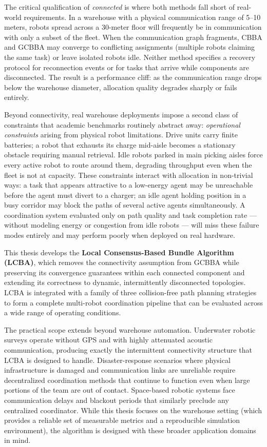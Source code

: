 The critical qualification of \emph{connected} is where both methods fall
short of real-world requirements.
In a warehouse with a physical communication range of 5--10 meters,
robots spread across a 30-meter floor will frequently be in communication with
only a subset of the fleet.
When the communication graph fragments, CBBA and GCBBA may converge to
conflicting assignments (multiple robots claiming the same task) or leave
isolated robots idle.
Neither method specifies a recovery protocol for reconnection events or for
tasks that arrive while components are disconnected.
The result is a performance cliff: as the communication range drops below
the warehouse diameter, allocation quality degrades sharply or fails entirely.

Beyond connectivity, real warehouse deployments impose a second class of
constraints that academic benchmarks routinely abstract away:
\emph{operational constraints} arising from physical robot limitations.
Drive units carry finite batteries; a robot that exhausts its charge
mid-aisle becomes a stationary obstacle requiring manual retrieval.
Idle robots parked in main picking aisles force every active robot to
route around them, degrading throughput even when the fleet is not at
capacity.
These constraints interact with allocation in non-trivial ways: a task that
appears attractive to a low-energy agent may be unreachable before the
agent must divert to a charger; an idle agent holding position in a busy
corridor may block the paths of several active agents simultaneously.
A coordination system evaluated only on path quality and task completion
rate --- without modeling energy or congestion from idle robots --- will
miss these failure modes entirely and may perform poorly when deployed
on real hardware.

This thesis develops the \textbf{Local Consensus-Based Bundle Algorithm
(LCBA)}, which removes the connectivity assumption from GCBBA while preserving
its convergence guarantees within each connected component and extending
its correctness to dynamic, intermittently disconnected topologies.
LCBA is integrated with a family of three collision-free path planning strategies
to form a complete multi-robot coordination pipeline that can be evaluated
across a wide range of operating conditions.

The practical scope extends beyond warehouse automation.
Underwater robotic surveys operate without GPS and with highly attenuated
acoustic communication, producing exactly the intermittent connectivity
structure that LCBA is designed to handle.
Disaster-response scenarios where physical infrastructure is damaged and
communication links are unreliable require decentralized coordination
methods that continue to function even when large portions of the team are
out of contact.
Space-based robotic systems face communication delays and blackout periods
that similarly preclude any centralized coordinator.
While this thesis focuses on the warehouse setting (which provides a reliable
set of measurable metrics and a reproducible simulation environment), the
algorithm is designed with these broader application domains in mind.


